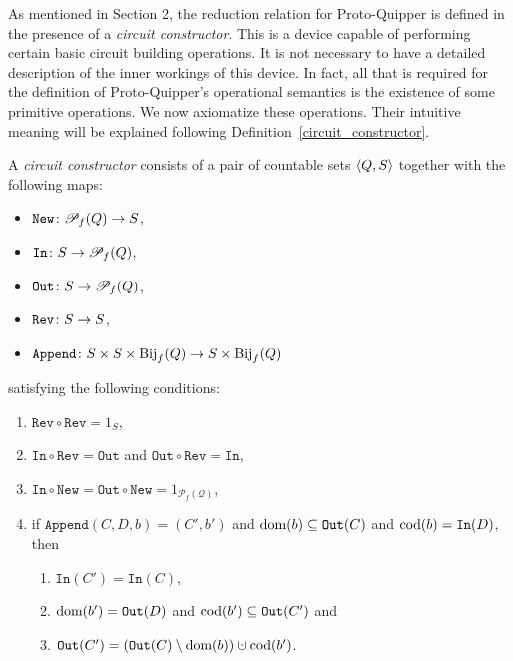 \documentclass[twoside]{article}
\begin{document}
As mentioned in Section 2, the reduction relation for Proto-Quipper is
defined in the presence of a \emph{circuit constructor}. This is a
device capable of performing certain basic circuit building
operations. It is not necessary to have a detailed description of the
inner workings of this device. In fact, all that is required for the
definition of Proto-Quipper's operational semantics is the existence
of some primitive operations. We now axiomatize these
operations. Their intuitive meaning will be explained following
Definition~\ref{circuit_constructor}.

\begin{definition}
\label{circuit_constructor}
A \emph{circuit constructor} consists of a pair of countable sets $\langle Q,S\rangle$ 
together with the following maps:
\begin{itemize}
  \item $\mathtt{New}\colon {\mathscr{P}}_f(Q) \to S$,
  \item $\mathtt{In}\colon S\to {\mathscr{P}}_f(Q)$,
  \item $\mathtt{Out}\colon S\to {\mathscr{P}}_f(Q)$,
  \item $\mathtt{Rev}\colon S \to S$,
  \item $\mathtt{Append}\colon S\times S\times \textrm{\rm Bij}_f(Q) \to S \times \textrm{\rm Bij}_f(Q)$
\end{itemize}
satisfying the following conditions:
\begin{enumerate}
  \item $\mathtt{Rev}\circ\mathtt{Rev}=1_S$,
  \item $\mathtt{In}\circ\mathtt{Rev}= \mathtt{Out}$ and 
        $\mathtt{Out}\circ\mathtt{Rev}= \mathtt{In}$\label{in_out_rev},
  \item $\mathtt{In}\circ\mathtt{New} = \mathtt{Out}\circ\mathtt{New} =
    1_{\mathcal{P}_f(\mathcal{Q})}$,
  \item if $\mathtt{Append} (C,D,b)=(C',b')$ and
    $\mathop{\textrm{\rm dom}}\nolimits(b)\subseteq\mathtt{Out}(C)$ and $\mathop{\textrm{\rm cod}}\nolimits(b)=\mathtt{In}(D)$,
    then \label{Append_cond_x}
    \begin{enumerate}
      \item $\mathtt{In}(C') = \mathtt{In}(C)$,\label{Append_cond_2b}    
      \item $\mathop{\textrm{\rm dom}}\nolimits(b')=\mathtt{Out}(D)$ and $\mathop{\textrm{\rm cod}}\nolimits(b')\subseteq\mathtt{Out}(C')$ and\label{Append_cond_2}
      \item $\mathtt{Out}(C')=
      (\mathtt{Out}(C)\setminus \dom(b))\cupdot\cod(b')$.\label{Append_cond_3}
    \end{enumerate}
\end{enumerate}
\end{definition}
\end{document}

